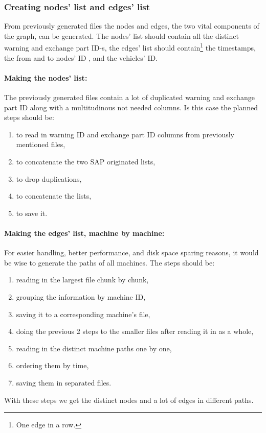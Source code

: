 		\subsubsection{Creating nodes' list and edges' list}
		From previously generated files the nodes and edges, the two vital components of the graph, can be generated. The nodes' list should contain all the distinct warning and exchange part ID-s, the edges' list should contain\footnote{One edge in a row.} the timestamps, the from and to nodes' ID , and the vehicles' ID.
		\paragraph{Making the nodes' list:}
		The previously generated files contain a lot of duplicated warning and exchange part ID along with a multitudinous not needed columns.
		Is this case the planned steps should be:
		\begin{enumerate}
			\item{to read in warning ID and exchange part ID columns from previously mentioned files,} 
			\item{to concatenate the two SAP originated lists,}
			\item{to drop duplications,}
			\item{to concatenate the lists,}
			\item{to save it.}
		 \end{enumerate}
		\paragraph{Making the edges' list, machine by machine:}
		For easier handling, better performance, and disk space sparing reasons, it would be wise to generate the paths of all machines.
		The steps should be:
		\begin{enumerate}
			\item{reading in the largest file chunk by chunk,} 
			\item{grouping the information by machine ID,}
			\item{saving it to a corresponding machine's file,}
			\item{doing the previous 2 steps to the smaller files after reading it in as a whole,}
			\item{reading in the distinct machine paths one by one,}
			\item{ordering them by time,}
			\item{saving them in separated files.}
		 \end{enumerate}
		With these steps we get the distinct nodes and a lot of edges in different paths.

